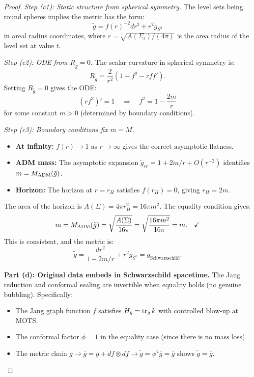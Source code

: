 \begin{proof}
\textit{Step (c1): Static structure from spherical symmetry.}
The level sets being round spheres implies the metric has the form:
\begin{equation}
    \tilde{g} = f(r)^{-2} dr^2 + r^2 g_{S^2}
\end{equation}
in areal radius coordinates, where $r = \sqrt{A(\Sigma_t)/(4\pi)}$ is the area radius of the level set at value $t$.

\textit{Step (c2): ODE from $R_{\tilde{g}} = 0$.}
The scalar curvature in spherical symmetry is:
\begin{equation}
    R_{\tilde{g}} = \frac{2}{r^2}\left(1 - f^2 - rf f'\right).
\end{equation}
Setting $R_{\tilde{g}} = 0$ gives the ODE:
\begin{equation}
    (r f^2)' = 1 \quad \Rightarrow \quad f^2 = 1 - \frac{2m}{r}
\end{equation}
for some constant $m > 0$ (determined by boundary conditions).

\textit{Step (c3): Boundary conditions fix $m = M$.}
\begin{itemize}
    \item \textbf{At infinity:} $f(r) \to 1$ as $r \to \infty$ gives the correct asymptotic flatness.
    \item \textbf{ADM mass:} The asymptotic expansion $\tilde{g}_{rr} = 1 + 2m/r + O(r^{-2})$ identifies $m = M_{\mathrm{ADM}}(\tilde{g})$.
    \item \textbf{Horizon:} The horizon at $r = r_H$ satisfies $f(r_H) = 0$, giving $r_H = 2m$.
\end{itemize}

The area of the horizon is $A(\Sigma) = 4\pi r_H^2 = 16\pi m^2$. The equality condition gives:
\begin{equation}
    m = M_{\mathrm{ADM}}(\tilde{g}) = \sqrt{\frac{A(\Sigma)}{16\pi}} = \sqrt{\frac{16\pi m^2}{16\pi}} = m. \quad \checkmark
\end{equation}
This is consistent, and the metric is:
\begin{equation}
    \tilde{g} = \frac{dr^2}{1 - 2m/r} + r^2 g_{S^2} = g_{\text{Schwarzschild}}.
\end{equation}

\textbf{Part (d): Original data embeds in Schwarzschild spacetime.}
The Jang reduction and conformal sealing are invertible when equality holds (no genuine bubbling). Specifically:
\begin{itemize}
    \item The Jang graph function $f$ satisfies $H_{\bar{g}} = \operatorname{tr}_{\bar{g}} k$ with controlled blow-up at MOTS.
    \item The conformal factor $\phi = 1$ in the equality case (since there is no mass loss).
    \item The metric chain $g \to \bar{g} = g + df \otimes df \to \tilde{g} = \phi^4 \bar{g} = \bar{g}$ shows $\tilde{g} = \bar{g}$.
\end{itemize}


\end{proof}
